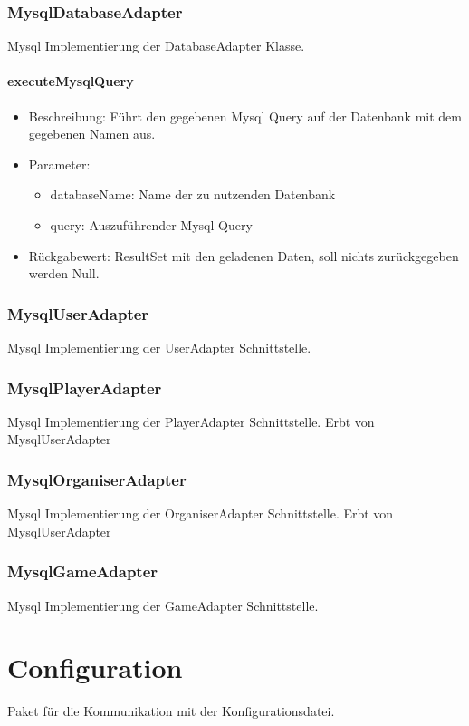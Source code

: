 \documentclass[a4paper]{scrreprt}
\begin{document}
	\subsubsection{MysqlDatabaseAdapter}
	Mysql Implementierung der DatabaseAdapter Klasse.

	\paragraph{executeMysqlQuery}
	\begin{itemize}
		\item Beschreibung: Führt den gegebenen Mysql Query auf der Datenbank mit dem gegebenen Namen aus.
		\item Parameter:
		\begin{itemize}
			\item databaseName: Name der zu nutzenden Datenbank
			\item query: Auszuführender Mysql-Query
		\end{itemize}
        \item Rückgabewert: ResultSet mit den geladenen Daten, soll nichts zurückgegeben werden Null.
	\end{itemize}

	\subsubsection{MysqlUserAdapter}
	Mysql Implementierung der UserAdapter Schnittstelle.

	\subsubsection{MysqlPlayerAdapter}
	Mysql Implementierung der PlayerAdapter Schnittstelle.
	Erbt von MysqlUserAdapter

	\subsubsection{MysqlOrganiserAdapter}
	Mysql Implementierung der OrganiserAdapter Schnittstelle.
	Erbt von MysqlUserAdapter

	\subsubsection{MysqlGameAdapter}
	Mysql Implementierung der GameAdapter Schnittstelle.

	\section{Configuration}
	Paket für die Kommunikation mit der Konfigurationsdatei.
\end{document}
